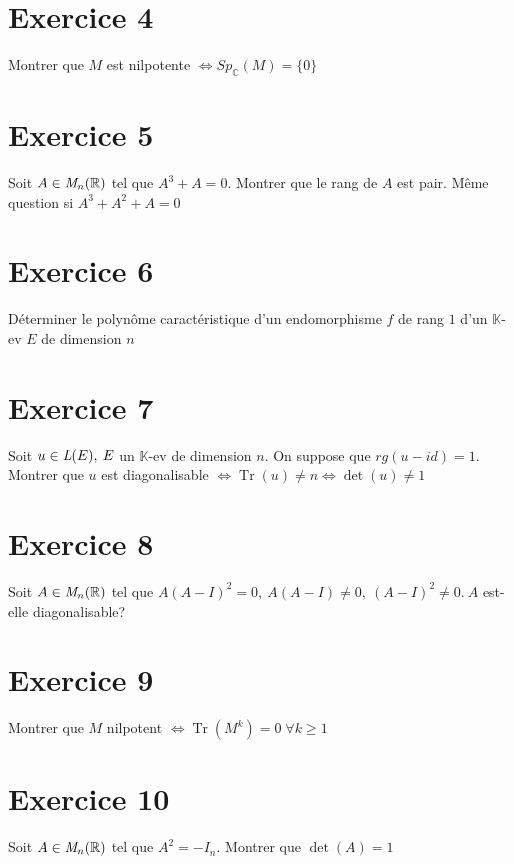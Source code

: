\documentclass[11pt]{article}
\begin{document}
\section*{Exercice 4}

Montrer que $M$ est nilpotente $\Leftrightarrow Sp_\mathbb{C}(M)=\{0\}$

\section*{Exercice 5}

Soit $A\in \emph{M}_n(\mathbb{R})$ tel que $A^3 + A =0$. Montrer que le rang de $A$ est pair. Même question si $A^3 +A^2 +A =0$

\section*{Exercice 6}

Déterminer le polynôme caractéristique d'un endomorphisme $f$ de rang $1$ d'un $\mathbb{K}$-ev $E$ de dimension $n$

\section*{Exercice 7}

Soit $u\in \emph{L}(E),\: E$ un $\mathbb{K}$-ev de dimension $n$. On suppose que $rg(u-id)=1$. Montrer que $u$ est diagonalisable $\Leftrightarrow \operatorname{Tr}(u)\ne n \Leftrightarrow \det(u) \ne 1$



\section*{Exercice 8}

Soit $A\in \emph{M}_n(\mathbb{R})$ tel que $A(A-I)^2 =0, \: A(A-I)\ne0, \:(A-I)^2\ne0.\: A$ est-elle diagonalisable?

\section*{Exercice 9}

Montrer que $M$ nilpotent $\Leftrightarrow \operatorname{Tr}(M^k)=0 \;\forall k \ge1$

\section*{Exercice 10}

Soit $A\in \emph{M}_n(\mathbb{R})$ tel que $A^2=-I_n$.\; Montrer que $\det(A)=1$
\end{document}
